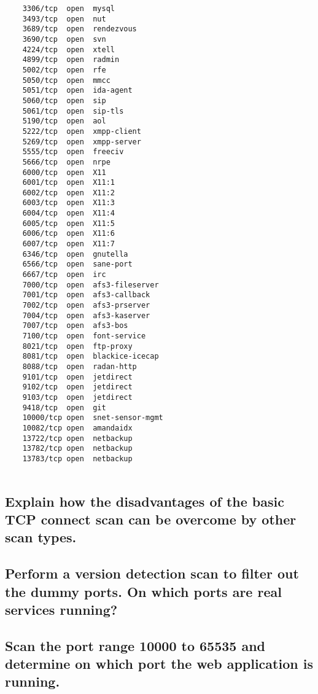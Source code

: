 \begin{lstlisting}
	3306/tcp  open  mysql
	3493/tcp  open  nut
	3689/tcp  open  rendezvous
	3690/tcp  open  svn
	4224/tcp  open  xtell
	4899/tcp  open  radmin
	5002/tcp  open  rfe
	5050/tcp  open  mmcc
	5051/tcp  open  ida-agent
	5060/tcp  open  sip
	5061/tcp  open  sip-tls
	5190/tcp  open  aol
	5222/tcp  open  xmpp-client
	5269/tcp  open  xmpp-server
	5555/tcp  open  freeciv
	5666/tcp  open  nrpe
	6000/tcp  open  X11
	6001/tcp  open  X11:1
	6002/tcp  open  X11:2
	6003/tcp  open  X11:3
	6004/tcp  open  X11:4
	6005/tcp  open  X11:5
	6006/tcp  open  X11:6
	6007/tcp  open  X11:7
	6346/tcp  open  gnutella
	6566/tcp  open  sane-port
	6667/tcp  open  irc
	7000/tcp  open  afs3-fileserver
	7001/tcp  open  afs3-callback
	7002/tcp  open  afs3-prserver
	7004/tcp  open  afs3-kaserver
	7007/tcp  open  afs3-bos
	7100/tcp  open  font-service
	8021/tcp  open  ftp-proxy
	8081/tcp  open  blackice-icecap
	8088/tcp  open  radan-http
	9101/tcp  open  jetdirect
	9102/tcp  open  jetdirect
	9103/tcp  open  jetdirect
	9418/tcp  open  git
	10000/tcp open  snet-sensor-mgmt
	10082/tcp open  amandaidx
	13722/tcp open  netbackup
	13782/tcp open  netbackup
	13783/tcp open  netbackup
	
\end{lstlisting}

\subsection{Explain how the disadvantages of the basic TCP connect scan can be overcome by other scan types.}



\subsection{Perform a version detection scan to filter out the dummy ports. On which ports are real services running?}

\subsection{Scan the port range 10000 to 65535 and determine on which port the web application is running.}

